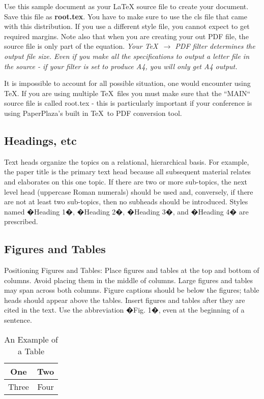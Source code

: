 \documentclass[letterpaper, 10 pt, conference]{ieeeconf}  %
\begin{document}
Use this sample document as your LaTeX source file to create your document. Save this file as {\bf root.tex}. You have to make sure to use the cls file that came with this distribution. If you use a different style file, you cannot expect to get required margins. Note also that when you are creating your out PDF file, the source file is only part of the equation. {\it Your \TeX\ $\rightarrow$ PDF filter determines the output file size. Even if you make all the specifications to output a letter file in the source - if your filter is set to produce A4, you will only get A4 output. }

It is impossible to account for all possible situation, one would encounter using \TeX. If you are using multiple \TeX\ files you must make sure that the ``MAIN`` source file is called root.tex - this is particularly important if your conference is using PaperPlaza's built in \TeX\ to PDF conversion tool.

\subsection{Headings, etc}

Text heads organize the topics on a relational, hierarchical basis. For example, the paper title is the primary text head because all subsequent material relates and elaborates on this one topic. If there are two or more sub-topics, the next level head (uppercase Roman numerals) should be used and, conversely, if there are not at least two sub-topics, then no subheads should be introduced. Styles named �Heading 1�, �Heading 2�, �Heading 3�, and �Heading 4� are prescribed.

\subsection{Figures and Tables}

Positioning Figures and Tables: Place figures and tables at the top and bottom of columns. Avoid placing them in the middle of columns. Large figures and tables may span across both columns. Figure captions should be below the figures; table heads should appear above the tables. Insert figures and tables after they are cited in the text. Use the abbreviation �Fig. 1�, even at the beginning of a sentence.

\begin{table}[h]
\caption{An Example of a Table}
\label{table_example}
\begin{center}
\begin{tabular}{|c||c|}
\hline
One & Two\\
\hline
Three & Four\\
\hline
\end{tabular}
\end{center}
\end{table}
\end{document}
